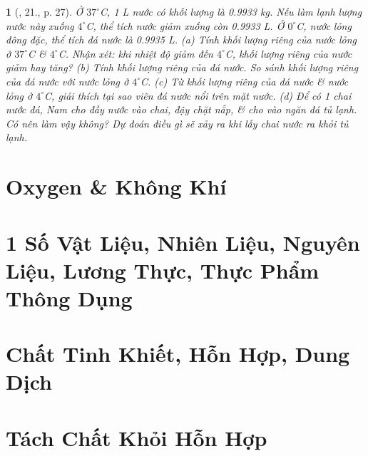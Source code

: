 \documentclass{article}
\newtheorem{baitoan}{}
\begin{document}
\begin{baitoan}[\cite{ncpt_KHTN_6_tap_1}, 21., p. 27]
	Ở $37^\circ${\rm C, 1 L} nước có khối lượng là {\rm0.9933 kg}. Nếu làm lạnh lượng nước này xuống $4^\circ${\rm C}, thể tích nước giảm xuống còn {\rm0.9933 L}. Ở $0^\circ${\rm C}, nước lỏng đông đặc, thể tích đá nước là {\rm0.9935 L}. (a) Tính khối lượng riêng của nước lỏng ở $37^\circ${\rm C} \& $4^\circ${\rm C}. Nhận xét: khi nhiệt độ giảm đến $4^\circ${\rm C}, khối lượng riêng của nước giảm hay tăng? (b) Tính khối lượng riêng của đá nước. So sánh khối lượng riêng của đá nước với nước lỏng ở $4^\circ${\rm C}. (c) Từ khối lượng riêng của đá nước \& nước lỏng ở $4^\circ${\rm C}, giải thích tại sao viên đá nước nổi trên mặt nước. (d) Để có 1 chai nước đá, Nam cho đầy nước vào chai, đậy chặt nắp, \& cho vào ngăn đá tủ lạnh. Có nên làm vậy không? Dự đoán điều gì sẽ xảy ra khi lấy chai nước ra khỏi tủ lạnh.
\end{baitoan}


\section{Oxygen \& Không Khí}


\section{1 Số Vật Liệu, Nhiên Liệu, Nguyên Liệu, Lương Thực, Thực Phẩm Thông Dụng}


\section{Chất Tinh Khiết, Hỗn Hợp, Dung Dịch}


\section{Tách Chất Khỏi Hỗn Hợp}

\end{document}
